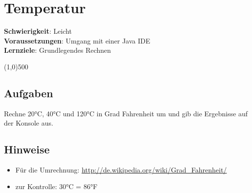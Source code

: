


\chapter*{Temperatur}

\headingfont
\parbox {\textwidth}{
    \textbf{Schwierigkeit}: Leicht \\
    \textbf{Voraussetzungen}: Umgang mit einer Java IDE \\
    \textbf{Lernziele}: Grundlegendes Rechnen
}
\normalfont
\begin{center}
\line(1,0){500}
\end{center}
\vspace{1cm}

\section*{Aufgaben}
Rechne 20°C, 40°C und 120°C in Grad Fahrenheit um und gib die Ergebnisse auf der Konsole aus.

\section*{Hinweise}
\begin{itemize}
     \item Für die Umrechnung: 
         \url{http://de.wikipedia.org/wiki/Grad_Fahrenheit/}
     \item zur Kontrolle: 30°C = 86°F
\end{itemize}

